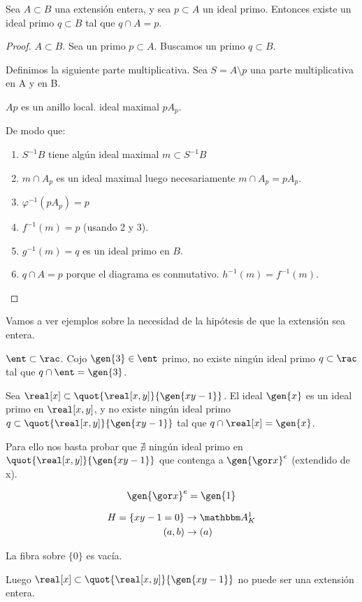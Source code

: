\begin{prop} \label{prop:ExtensionEnteraPrimos}
	Sea $A \subset B$ una extensión entera, y sea $p \subset A$ un ideal primo. Entonces existe un ideal primo $q \subset B$ tal que $q \cap A=p$.
\end{prop}

\begin{proof}
	$A \subset B$. Sea un primo $p \subset A$. Buscamos un primo $q \subset B$.

	Definimos la siguiente parte multiplicativa. Sea $S=A \setminus p$ una parte multiplicativa en A y en B.


	$Ap$ es un anillo local. ideal maximal $pA_p$.

	De modo que:
	\begin{enumerate}
	 	\item $S^{-1}B$ tiene algún ideal maximal $m \subset S^{-1}B$
	 	\item $m \cap A_p$ es un ideal maximal luego necesariamente $m \cap A_p=pA_p$.
		\item $\varphi^{-1}(pA_p)=p$
		\item $f^{-1}(m)=p$ (usando 2 y 3).
		\item $g^{-1}(m)=q$ es un ideal primo en $B$.
		\item $q \cap A = p$ porque el diagrama es conmutativo. $h^{-1}(m)=f^{-1}(m)$.
	\end{enumerate}
\end{proof}

Vamos a ver ejemplos sobre la necesidad de la hipótesis de que la extensión sea entera.
\begin{example}
	$\ent \subset \rac $. Cojo $\gen{3} \in \ent$ primo, no existe ningún ideal primo $q \subset \rac$ tal que $q \cap \ent = \gen{3}$.
\end{example}

\begin{example}
	Sea $\real[x] \subset \quot{\real[x,y]}{\gen{xy-1}}$. El ideal $\gen{x}$ es un ideal primo en $\real[x,y]$, y no existe ningún ideal primo $q \subset  \quot{\real[x,y]}{\gen{xy-1}}$ tal que $q \cap \real[x]=\gen{x}$.

	Para ello nos basta probar que $\nexists$ ningún ideal primo en $ \quot{\real[x,y]}{\gen{xy-1}}$ que contenga a $\gen{\cls{x}}^e$ (extendido de x).

	$$ \gen{\cls{x}}^e=\gen{1}$$

	\begin{align*}
		H=\{xy-1=0\} & \rightarrow \A^1_K \\
		(a,b) & \rightarrow (a)
	\end{align*}

	La fibra sobre $\{0\}$ es vacía.

	Luego $\real[x] \subset \quot{\real[x,y]}{\gen{xy-1}}$ no puede ser una extensión entera.
\end{example}

